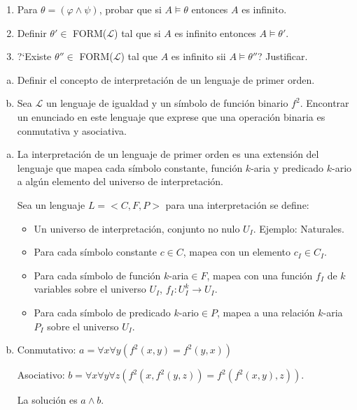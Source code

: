 \begin{questions}
\begin{enumerate}
 \item Para $\theta = (\varphi \wedge \psi)$, probar que si $A\vDash\theta$ entonces $A$ es infinito. 
 
 \item Definir $\theta'\in$ FORM($\mathcal{L}$) tal que si $A$ es infinito entonces $A\vDash \theta'$. 
 
 \item ?`Existe $\theta'' \in$ FORM($\mathcal{L}$) tal que $A$ es infinito sii $A\vDash\theta''$? Justificar. 
\end{enumerate}


\question  
\begin{enumerate}[a)]
  \item Definir el concepto de interpretaci\'on de un lenguaje de primer orden. 
  \item Sea $\mathcal{L}$ un lenguaje de igualdad y un s\'imbolo de funci\'on binario $f^2$. Encontrar un enunciado en este lenguaje que exprese que una operaci\'on binaria es conmutativa y asociativa. 
\end{enumerate}


\begin{solution}
 
 \begin{enumerate}[a)]
  \item  La interpretación de un lenguaje de primer orden es una extensión del lenguaje que mapea cada símbolo constante, función $k$-aria y predicado $k$-ario a algún elemento del universo de interpretación.
  
  Sea un lenguaje $L=< C,F,P>$ para una interpretaci\'on se define: 
  \begin{itemize}
   \item Un universo de interpretaci\'on, conjunto no nulo $U_I$. Ejemplo: Naturales. 
   \item Para cada s\'imbolo constante $c\in C$, mapea con un elemento $c_I \in C_I$. 
   \item Para cada s\'imbolo de funci\'on $k$-aria$\in F$, mapea con una funci\'on $f_I$ de $k$ variables sobre el universo $U_I$, $f_I : U_I^k \rightarrow U_I$. 
   \item Para cada s\'imbolo de predicado $k$-ario$\in P$, mapea a una relaci\'on $k$-aria $P_I$ sobre el universo $U_I$. 
  \end{itemize}
  
  \item Conmutativo: $a = \forall x \forall y(f^2(x,y)=f^2(y,x))$
  
  Asociativo: $b=\forall x\forall y\forall z(f^2(x,f^2(y,z)) = f^2(f^2(x,y),z))$.
  
  La soluci\'on es $a\wedge b$. 
 \end{enumerate}

\end{solution}

\end{questions}
